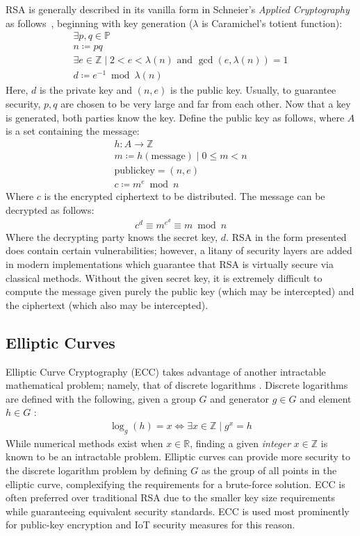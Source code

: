 \documentclass[12pt]{article}
\begin{document}
RSA is generally described in its vanilla form in Schneier's \emph{Applied Cryptography} as follows~\autocite{schneier_applied_1996}, beginning with key generation ($\lambda$ is Caramichel's totient function):
\begin{gather*}
    \exists p, q  \in \mathbb{P}\\
    n \coloneqq pq \\
    \exists e \in \mathbb{Z} \mid 2 < e < \lambda(n) \text{ and } \gcd(e, \lambda(n)) = 1 \\
    d \coloneqq e^{-1} \bmod{\lambda(n)}
\end{gather*}
Here, $d$ is the private key and $(n, e)$ is the public key.
Usually, to guarantee security, $p, q$ are chosen to be very large and far from each other.
Now that a key is generated, both parties know the key.
Define the public key as follows, where $A$ is a set containing the message:
\begin{gather*}
    h: A \to \mathbb{Z} \\
    m \coloneqq h(\text{message}) \mid 0 \leq m < n \\
    \text{publickey} = (n, e) \\
    c \coloneqq m^e \bmod{n}
\end{gather*}
Where $c$ is the encrypted ciphertext to be distributed.
The message can be decrypted as follows:
\begin{gather*}
    c^d \equiv m^{e^d} \equiv m \bmod {n}
\end{gather*}
Where the decrypting party knows the secret key, $d$.
RSA in the form presented does contain certain vulnerabilities; however, a litany of security layers are added in modern implementations which guarantee that RSA is virtually secure via classical methods.
Without the given secret key, it is extremely difficult to compute the message given purely the public key (which may be intercepted) and the ciphertext (which also may be intercepted).

\subsection{Elliptic Curves}
Elliptic Curve Cryptography (ECC) takes advantage of another intractable mathematical problem; namely, that of discrete logarithms \autocite{schneier_applied_1996}. 
Discrete logarithms are defined with the following, given a group $G$ and generator $g \in G$ and element $h \in G$ \autocite{schneier_applied_1996}: 
\begin{gather*}
    \log_{g}(h) = x \iff \exists x \in \mathbb{Z} \mid g^x = h
\end{gather*}
While numerical methods exist when $x \in \mathbb{R}$, finding a given \emph{integer} $x \in \mathbb{Z}$ is known to be an intractable problem. 
Elliptic curves can provide more security to the discrete logarithm problem by defining $G$ as the group of all points in the elliptic curve, complexifying the requirements for a brute-force solution. 
ECC is often preferred over traditional RSA due to the smaller key size requirements while guaranteeing equivalent security standards.
ECC is used most prominently for public-key encryption\autocite{dhillon_elliptic_2016} and IoT security measures \autocite{tiwari_novel_2018} for this reason. 
\end{document}
